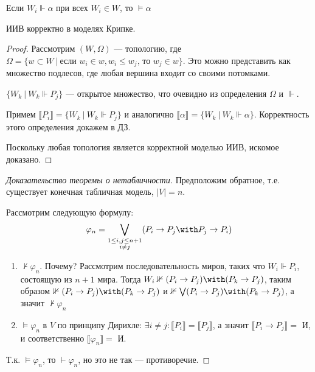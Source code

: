 \documentclass[12pt, a4paper, oneside]{book}
\begin{document}
\begin{definition}
    Если \(W_i \Vdash \alpha\) при всех \(W_i\in W\), то \(\models \alpha\)
\end{definition}

\begin{theorem}
    ИИВ корректно в моделях Крипке.
\end{theorem}
\begin{proof}
    Рассмотрим \((W, \Omega)\) --- топологию, где \(\Omega = \{w\subset W \ |\ \text{если } w_i \in w, w_i \leq w_j \text{, то } w_j\in w\} \). Это можно представить как множество подлесов, где любая вершина входит со своими потомками.

    \(\{W_k\ |\ W_k \Vdash P_j\}\) --- открытое множество, что очевидно из определения \(\Omega\) и \(\Vdash\).

    Примем \(\llbracket P_i \rrbracket = \{W_k\ |\ W_k\Vdash P_j\}\) и аналогично \(\llbracket \alpha \rrbracket = \{W_k\ |\ W_k \Vdash \alpha\}\). Корректность этого определения докажем в ДЗ.

    Поскольку любая топология является корректной моделью ИИВ, искомое доказано.
\end{proof}

\begin{proof}[Доказательство теоремы о нетабличности]
    Предположим обратное, т.е. существует конечная табличная модель, \(|V| = n\).

    Рассмотрим следующую формулу:
    \[\varphi_n = \bigvee_{\substack{ 1 \leq i, j \leq n + 1 \\ i \neq j}} (P_i \to P_j \with P_j \to P_i)\]

    \begin{enumerate}
        \item \(\nvdash\varphi_n\). Почему? Рассмотрим последовательность миров, таких что \(W_i \Vdash P_i\), состоящую из \(n + 1\) мира. Тогда \(W_i \nVdash (P_i \to P_j) \with (P_k \to P_j)\), таким образом \(\nVdash (P_i \to P_j) \with (P_k \to P_j)\) и \(\nVdash \bigvee (P_i \to P_j) \with (P_k \to P_j)\), а значит \(\nvdash \varphi_n\)
        \item \(\models \varphi_n\) в \(V\) по принципу Дирихле: \(\exists i \neq j : \llbracket P_i \rrbracket = \llbracket P_j \rrbracket\), а значит \(\llbracket P_i \to P_j \rrbracket = \) И, и соответственно \(\llbracket \varphi_n \rrbracket =\) И.
    \end{enumerate}

    Т.к. \(\models \varphi_n\), то \(\vdash \varphi_n\), но это не так --- противоречие.
\end{proof}
\end{document}
